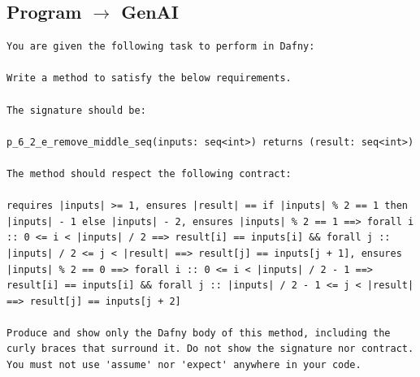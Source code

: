 \documentclass{article}
\begin{document}
\subsection*{Program $\rightarrow$ GenAI}
\begin{lstlisting}
You are given the following task to perform in Dafny:

Write a method to satisfy the below requirements.

The signature should be:

p_6_2_e_remove_middle_seq(inputs: seq<int>) returns (result: seq<int>)

The method should respect the following contract:

requires |inputs| >= 1, ensures |result| == if |inputs| % 2 == 1 then |inputs| - 1 else |inputs| - 2, ensures |inputs| % 2 == 1 ==> forall i :: 0 <= i < |inputs| / 2 ==> result[i] == inputs[i] && forall j :: |inputs| / 2 <= j < |result| ==> result[j] == inputs[j + 1], ensures |inputs| % 2 == 0 ==> forall i :: 0 <= i < |inputs| / 2 - 1 ==> result[i] == inputs[i] && forall j :: |inputs| / 2 - 1 <= j < |result| ==> result[j] == inputs[j + 2]

Produce and show only the Dafny body of this method, including the curly braces that surround it. Do not show the signature nor contract. You must not use 'assume' nor 'expect' anywhere in your code.
\end{lstlisting}
\end{document}
